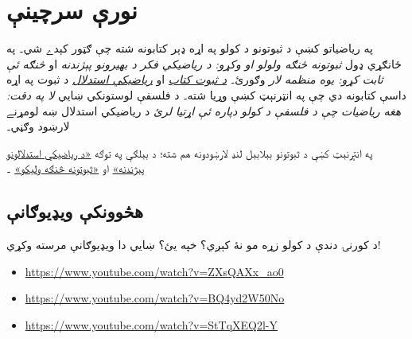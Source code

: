 \documentclass[../../../include/open-logic-section]{subfiles}
\begin{document}

\section{نورې سرچينې}

په رياضياتو کښې د ثبوتونو د کولو په اړه ډېر کتابونه
شته چې ګټور کېدے شي۔ په ځانګړي ډول \emph{ثبوتونه
څنګه ولولو او وکړو: د رياضيکي فکر د بهيرونو پېژندنه}
\citep{Solow2013} او \emph{څنګه ئې ثابت کړو: يوه منظمه
لار} \citep{Velleman2019} وګورئ۔
\href{http://www.people.vcu.edu/~rhammack/BookOfProof/BookOfProof.pdf}{\emph{د ثبوت کتاب}}
\citep{Hammack2013} او
\href{https://scholarworks.gvsu.edu/books/7/}{\emph{رياضيکي استدلال}}
\citep{Sandstrum2019} د ثبوت په اړه داسې کتابونه دي
چې په انټرنېټ کښې وړيا شته۔ د فلسفې لوستونکي ښايي
\emph{لا په دقت: هغه رياضيات چې د فلسفې د کولو
دپاره ئې اړتيا لرئ} \citep{Steinhart2018} د رياضيکي
استدلال ښه لومړنے لارښود وګڼي۔

په انټرنېټ کښې د ثبوتونو بېلابېل لنډ لارښودونه هم
شته؛ د بېلګې په توګه
\href{https://math.berkeley.edu/~hutching/teach/proofs.pdf}{«د رياضيکي استدلالونو پېژندنه»}
\citep{Hutchings2003} او
\href{https://eugeniacheng.com/wp-content/uploads/2017/02/cheng-proofguide.pdf}{«ثبوتونه څنګه وليکو»}
\citep{Cheng2004}۔

\subsection{هڅوونکې ويډيوګانې}

د کورنۍ دندې د کولو زړه مو نۀ کېږي؟ خپه يئ؟
ښايي دا ويډيوګانې مرسته وکړي!

\begin{itemize}
\item \url{https://www.youtube.com/watch?v=ZXsQAXx_ao0}
\item \url{https://www.youtube.com/watch?v=BQ4yd2W50No}
\item \url{https://www.youtube.com/watch?v=StTqXEQ2l-Y}
\end{itemize}
\end{document}
